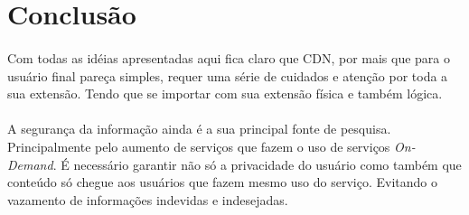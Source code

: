 \section{Conclus\~ao} \label{sec:conclusao}

\paragraph{}
Com todas as id\'eias apresentadas aqui fica claro que CDN, por mais que para o usu\'ario final pare\c{c}a simples, requer uma s\'erie de cuidados e aten\c{c}\~ao por toda a sua extens\~ao. Tendo que se importar com sua extens\~ao f\'isica e tamb\'em l\'ogica.
\paragraph{}
A seguran\c{c}a da informa\c{c}\~ao ainda \'e a sua principal fonte de pesquisa. Principalmente pelo aumento de servi\c{c}os que fazem o uso de servi\c{c}os \textit{On-Demand}. \'E necess\'ario garantir n\~ao s\'o a privacidade do usu\'ario como tamb\'em que conte\'udo s\'o chegue aos usu\'arios que fazem mesmo uso do servi\c{c}o. Evitando o vazamento de informa\c{c}\~oes indevidas e indesejadas.